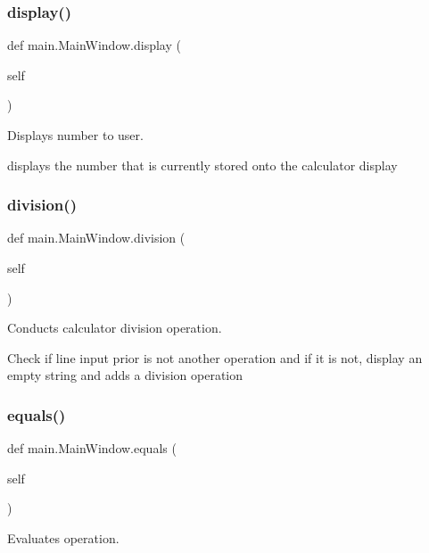 \subsubsection{\texorpdfstring{display()}{display()}}
{\footnotesize\ttfamily def main.\+Main\+Window.\+display (\begin{DoxyParamCaption}\item[{}]{self }\end{DoxyParamCaption})}



Displays number to user. 

displays the number that is currently stored onto the calculator display \mbox{\label{classmain_1_1_main_window_a74162ce8832ff39d12773e129aaca8fb}} 
\subsubsection{\texorpdfstring{division()}{division()}}
{\footnotesize\ttfamily def main.\+Main\+Window.\+division (\begin{DoxyParamCaption}\item[{}]{self }\end{DoxyParamCaption})}



Conducts calculator division operation. 

Check if line input prior is not another operation and if it is not, display an empty string and adds a division operation \mbox{\label{classmain_1_1_main_window_a153d3cd5e2476e7f262d67600c77c1fc}} 
\subsubsection{\texorpdfstring{equals()}{equals()}}
{\footnotesize\ttfamily def main.\+Main\+Window.\+equals (\begin{DoxyParamCaption}\item[{}]{self }\end{DoxyParamCaption})}



Evaluates operation. 

